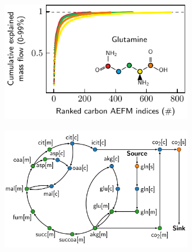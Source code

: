 \documentclass[varwidth]{standalone}
\begin{document}
\vspace*{-2ex}
\begin{figure}
    \begin{subfigure}[t]{0.495\textwidth}
        \caption{}
        \centering
        \includegraphics[width=0.9\textwidth]{subpanel-a/cumulative-source-met-14.pdf}
    \end{subfigure}
    \begin{subfigure}[t]{0.495\textwidth}
        \caption{}
        \includegraphics[width=0.9\textwidth]{subpanel-b/network-top-5.pdf}
    \end{subfigure}
    \begin{subfigure}[t]{0.495\textwidth}
        \vspace*{-2ex}
        \caption{}
        \centering

\end{subfigure}
\end{figure}
\end{document}
